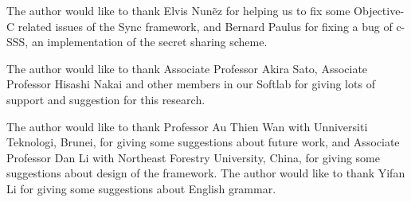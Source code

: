 \documentclass[a4paper,11pt]{report}
\begin{document}
The author would like to thank Elvis Nun{\~e}z for helping us to fix some Objective-C related issues of the Sync framework, and Bernard Paulus for fixing a bug of c-SSS, an implementation of the secret sharing scheme.

The author would like to thank Associate Professor Akira Sato, Associate Professor Hisashi Nakai and other members in our Softlab for giving lots of support and suggestion for this research.

The author would like to thank Professor Au Thien Wan with Unniversiti Teknologi, Brunei, for giving some suggestions about future work, and Associate Professor Dan Li with Northeast Forestry University, China, for giving some suggestions about design of the framework.
The author would like to thank Yifan Li for giving some suggestions about English grammar.

\newpage

\renewcommand{\bibname}{Bibliography}
%
%


 
\end{document}

